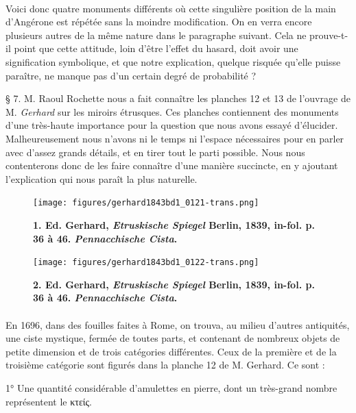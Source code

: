 \documentclass[a4paper, 11pt, oneside, polutonikogreek, french]{article}
\begin{document}
\paragraph{}
Voici donc quatre monuments différents où cette singulière position de la main d'Angérone est répétée sans la moindre modification. On en verra encore plusieurs autres de la même nature dans le paragraphe suivant. Cela ne prouve-t-il point que cette attitude, loin d'être l'effet du hasard, doit avoir une signification symbolique, et que notre explication, quelque risquée qu'elle puisse paraître, ne manque pas d'un certain degré de probabilité ?

§ 7. M. Raoul Rochette nous a fait connaître les planches 12 et 13 de l'ouvrage de M. \emph{Gerhard} sur les miroirs étrusques. Ces planches contiennent des monuments d'une très-haute importance pour la question que nous avons essayé d'élucider. Malheureusement nous n'avons ni le temps ni l'espace nécessaires pour en parler avec d'assez grands détails, et en tirer tout le parti possible. Nous nous contenterons donc de les faire connaître d'une manière succincte, en y ajoutant l'explication qui nous paraît la plus naturelle.
\clearpage
\vspace*{\fill}
\begin{figure}[H]
\centering
\texttt{[image: figures/gerhard1843bd1\_0121-trans.png]}
\caption{\bfseries 1. Ed. Gerhard, \emph{Etruskische Spiegel} Berlin, 1839, in-fol. p. 36 à 46. \emph{Pennacchische Cista}.}
\end{figure}
\vspace*{\fill}
\clearpage
\vspace*{\fill}
\begin{figure}[H]
\centering
\texttt{[image: figures/gerhard1843bd1\_0122-trans.png]}
\caption{\bfseries 2. Ed. Gerhard, \emph{Etruskische Spiegel} Berlin, 1839, in-fol. p. 36 à 46. \emph{Pennacchische Cista}.}
\end{figure}
\vspace*{\fill}
\paragraph{}
En 1696, dans des fouilles faites à Rome, on trouva, au milieu d'autres antiquités, une ciste mystique, fermée de toutes parts, et contenant de nombreux objets de petite dimension et de trois catégories différentes. Ceux de la première et de la troisième catégorie sont figurés dans la planche 12 de M. Gerhard. Ce sont :

1° Une quantité considérable d'amulettes en pierre, dont un très-grand nombre représentent le κτείς.
\end{document}
